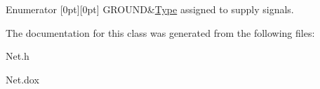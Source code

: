 \begin{DoxyEnumFields}{Enumerator}
[0pt][0pt]{}\mbox{\label{classHurricane_1_1Net_1_1Type_a2652e3299403e0f5979a848b267163a5a87f5f36bbfcfac211f3dff73a8e46e65}} 
G\+R\+O\+U\+ND&\mbox{\hyperlink{classHurricane_1_1Net_1_1Type}{Type}} assigned to supply signals. \\
\hline

\end{DoxyEnumFields}


The documentation for this class was generated from the following files\+:\begin{DoxyCompactItemize}
\item 
Net.\+h\item 
Net.\+dox\end{DoxyCompactItemize}
